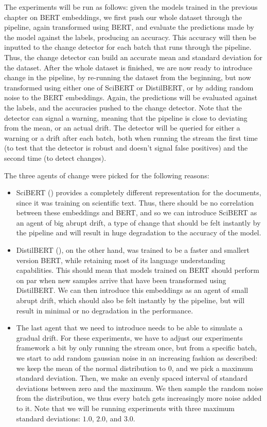 \documentclass[12pt]{extreport}
\begin{document}
The experiments will be run as follows: given the models trained in the previous chapter on BERT embeddings, we first push our whole dataset through the pipeline, again transformed using BERT, and evaluate the predictions made by the model against the labels, producing an accuracy. This accuracy will then be inputted to the change detector for each batch that runs through the pipeline. Thus, the change detector can build an accurate mean and standard deviation for the dataset. After the whole dataset is finished, we are now ready to introduce change in the pipeline, by re-running the dataset from the beginning, but now transformed using either one of SciBERT or DistilBERT, or by adding random noise to the BERT embeddings. Again, the predictions will be evaluated against the labels, and the accuracies pushed to the change detector. Note that the detector can signal a warning, meaning that the pipeline is close to deviating from the mean, or an actual drift. The detector will be queried for either a warning or a drift after each batch, both when running the stream the first time (to test that the detector is robust and doesn't signal false positives) and the second time (to detect changes).

The three agents of change were picked for the following reasons:
\begin{itemize}
    \item SciBERT (\cite{scibert}) provides a completely different representation for the documents, since it was training on scientific text. Thus, there should be no correlation between these embeddings and BERT, and so we can introduce SciBERT as an agent of big abrupt drift, a type of change that should be felt instantly by the pipeline and will result in huge degradation to the accuracy of the model.
    \item DistilBERT (\cite{distilbert}), on the other hand, was trained to be a faster and smallert version BERT, while retaining most of its language understanding capabilities. This should mean that models trained on BERT should perform on par when new samples arrive that have been transformed using DistilBERT. We can then introduce this embeddings as an agent of small abrupt drift, which should also be felt instantly by the pipeline, but will result in minimal or no degradation in the performance.
    \item The last agent that we need to introduce needs to be able to simulate a gradual drift. For these experiments, we have to adjust our experiments framework a bit by only running the stream once, but from a specific batch, we start to add random gaussian noise in an increasing fashion as described: we keep the mean of the normal distribution to 0, and we pick a maximum standard deviation. Then, we make an evenly spaced interval of standard deviations between zero and the maximum. We then sample the random noise from the distribution, we thus every batch gets increasingly more noise added to it. Note that we will be running experiments with three maximum standard deviations: $1.0$, $2.0$, and $3.0$.
\end{itemize}
\end{document}
